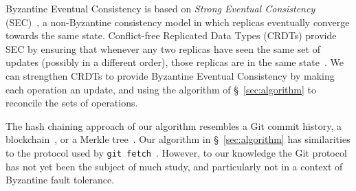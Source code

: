 \documentclass[a4paper,anonymous,USenglish]{lipics-v2019}
\begin{document}
Byzantine Eventual Consistency is based on \emph{Strong Eventual Consistency} (SEC)~\cite{Shapiro:2011}, a non-Byzantine consistency model in which replicas eventually converge towards the same state.
Conflict-free Replicated Data Types (CRDTs) provide SEC by ensuring that whenever any two replicas have seen the same set of updates (possibly in a different order), those replicas are in the same state~\cite{Shapiro:2011}.
We can strengthen CRDTs to provide Byzantine Eventual Consistency by making each operation an update, and using the algorithm of \S~\ref{sec:algorithm} to reconcile the sets of operations.

The hash chaining approach of our algorithm resembles a Git commit history, a blockchain~\cite{Bano:2019}, or a Merkle tree~\cite{Merkle:1987}.
Our algorithm in \S~\ref{sec:algorithm} has similarities to the protocol used by \texttt{git fetch}~\cite{GitHTTP}.
However, to our knowledge the Git protocol has not yet been the subject of much study, and particularly not in a context of Byzantine fault tolerance.








\end{document}
